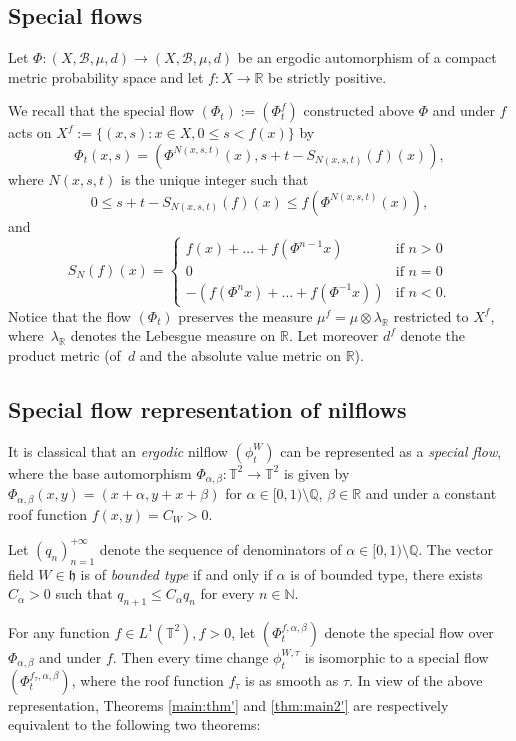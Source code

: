 \documentclass[JEP,XML,SOM,Unicode,NoEqCountersInSection]{cedram}
\let\mathcal\mathscr
\newcounter{case}
\theoremstyle{definition}
\theoremstyle{plain}
\newcommand\NN{\mathbb{N}}
\newcommand\QQ{\mathbb{Q}}
\newcommand\RR{\mathbb{R}}
\newcommand\TT{\mathbb{T}}
\newcommand\cB{\mathcal{B}}
\begin{document}
\subsection{Special flows}
Let $\Phi:(X, \cB, \mu,d)\to (X,\cB,\mu,d)$ be an ergodic automorphism of a compact metric probability space and let $f:X\to \RR$ be strictly positive.

We recall that the special flow $(\Phi_t):=(\Phi_t^{f})$ constructed above $\Phi$ and under $f$ acts on $X^f:=\{(x,s): x\in X, 0\leq s<f(x)\}$ by
\[
\Phi_t(x,s)=(\Phi^{N(x,s,t)}(x),s+t-S_{N(x,s,t)}(f)(x)),
\]
where $N(x,s,t)$ is the unique integer such that
\begin{equation*}
\label{D-C}
0 \leq s+t- S_{N(x,s,t)}(f) (x) \leq f(\Phi^{N(x,s,t)}(x)),
\end{equation*}
and
\[
S_{N}(f) (x)=\begin{cases}
f(x)+\ldots+f(\Phi^{n-1}x) &\mbox{if } n>0\\
0&\mbox{if } n=0\\
-(f(\Phi^nx)+\ldots+f(\Phi^{-1}x))&\mbox{if } n<0.
\end{cases}
\]
Notice that the flow $(\Phi_t)$ preserves the measure $\mu^f=\mu\otimes \lambda_\RR$ restricted to $X^f$, where~$\lambda_\RR$ denotes the Lebesgue
measure on $\RR$. Let moreover $d^f$ denote the product metric (of~$d$ and the absolute value metric on $\RR$).

\subsection{Special flow representation of nilflows}\label{sec.Heis}
It is classical that an \emph{ergodic} nilflow $(\phi_t^W)$ can be represented as a \emph{special flow}, where the base automorphism $\Phi_{\alpha,\beta}:\TT^2\to \TT^2$ is given by $\Phi_{\alpha,\beta}(x,y)=(x+\alpha,y+x+\beta)$ for $\alpha\in [0,1)\setminus \QQ$, $\beta\in \RR$ and under a constant roof function $f(x,y)=C_W>0$.

Let $(q_n)_{n=1}^{+\infty}$ denote the sequence of denominators of $\alpha\in [0,1)\setminus \QQ$. The vector field $W\in \mathfrak h$ is of \emph{bounded type} if and only if $\alpha$ is of bounded type, \ie there exists $C_\alpha>0$ such that $q_{n+1}\leq C_\alpha q_n$ for every $n\in \NN$.

For any function $f\in L^1(\TT^2), f>0$, let $(\Phi_t^{f,\alpha, \beta})$ denote the special flow over $\Phi_{\alpha, \beta}$ and under $f$. Then every time change $\phi_t^{W,\tau}$ is isomorphic to a special flow $(\Phi_t^{f_{\tau},\alpha,\beta})$, where the roof function $f_\tau$ is as smooth as $\tau$. In view of the above representation, Theorems \ref{main:thm'} and \ref{thm:main2'} are respectively equivalent to the following two theorems:
\end{document}
